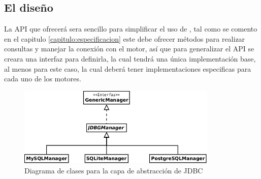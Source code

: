 \subsection{El diseño}
La API que ofrecerá \jj sera sencillo para simplificar el uso de \jd, tal  como se comento en el capitulo \ref{capitulo:especificacion} este debe ofrecer métodos para realizar consultas y manejar la conexión con el motor, así que para generalizar el API se creara una interfaz para definirla, la cual tendrá una única implementación base, al menos para este caso, la cual deberá tener implementaciones especificas para cada uno de los motores.
%
\begin{figure}
  \centering
    \includegraphics[width=0.85\textwidth]{figuras/jdbgm-jdbc.png}
  \caption{Diagrama de clases para la capa de abstracción de JDBC}
  \label{fig:jdbgm-jdbc}
\end{figure}

